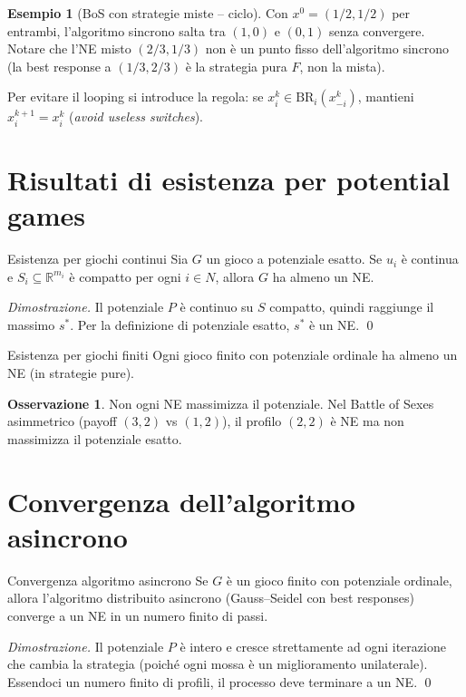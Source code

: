 \documentclass[12pt,a4paper,twoside]{book}
\theoremstyle{plain}
\theoremstyle{definition}
\newtheorem{example}[theorem]{Esempio}
\newtheorem{remark}[theorem]{Osservazione}
\newcommand{\BR}{\mathrm{BR}}
\begin{document}
\begin{example}[BoS con strategie miste -- ciclo]
Con $x^0=(1/2,1/2)$ per entrambi, l'algoritmo sincrono salta tra $(1,0)$ e $(0,1)$ senza convergere. Notare che l'NE misto $(2/3,1/3)$ non è un punto fisso dell'algoritmo sincrono (la best response a $(1/3,2/3)$ è la strategia pura $F$, non la mista).
\end{example}

Per evitare il looping si introduce la regola: se $x_i^k\in\BR_i(x_{-i}^k)$, mantieni $x_i^{k+1}=x_i^k$ (\emph{avoid useless switches}).

\section{Risultati di esistenza per potential games}

\begin{thmbox}{Esistenza per giochi continui}
Sia $G$ un gioco a potenziale esatto. Se $u_i$ è continua e $S_i\subseteq\mathbb{R}^{m_i}$ è compatto per ogni $i\in N$, allora $G$ ha almeno un NE.
\end{thmbox}
\textit{Dimostrazione.} Il potenziale $P$ è continuo su $S$ compatto, quindi raggiunge il massimo $s^*$. Per la definizione di potenziale esatto, $s^*$ è un NE. \qed

\begin{thmbox}{Esistenza per giochi finiti}
Ogni gioco finito con potenziale ordinale ha almeno un NE (in strategie pure).
\end{thmbox}

\begin{remark}
Non ogni NE massimizza il potenziale. Nel Battle of Sexes asimmetrico (payoff $(3,2)$ vs $(1,2)$), il profilo $(2,2)$ è NE ma non massimizza il potenziale esatto.
\end{remark}

\section{Convergenza dell'algoritmo asincrono}

\begin{thmbox}{Convergenza algoritmo asincrono}
Se $G$ è un gioco finito con potenziale ordinale, allora l'algoritmo distribuito asincrono (Gauss--Seidel con best responses) converge a un NE in un numero finito di passi.
\end{thmbox}
\textit{Dimostrazione.} Il potenziale $P$ è intero e cresce strettamente ad ogni iterazione che cambia la strategia (poiché ogni mossa è un miglioramento unilaterale). Essendoci un numero finito di profili, il processo deve terminare a un NE. \qed
\end{document}
